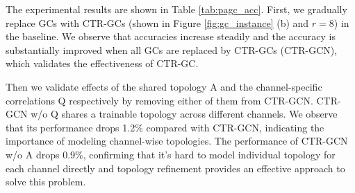 \documentclass[10pt,twocolumn,letterpaper]{article}
\begin{document}
The experimental results are shown in Table \ref{tab:pagc_acc}. First, we gradually replace GCs with CTR-GCs (shown in Figure \ref{fig:gc_instance} (b) and $r=8$) in the baseline. We observe that accuracies increase steadily and the accuracy is substantially improved when all GCs are replaced by CTR-GCs (CTR-GCN), which validates the effectiveness of CTR-GC. 

Then we validate effects of the shared topology A and the channel-specific correlations Q respectively by removing either of them from CTR-GCN. CTR-GCN w/o Q shares a trainable topology across different channels. We observe that its performance drops 1.2\% compared with CTR-GCN, indicating the importance of modeling channel-wise topologies. The performance of CTR-GCN w/o A drops 0.9\%, confirming that it's hard to model individual topology for each channel directly and topology refinement provides an effective approach to solve this problem.
\end{document}

